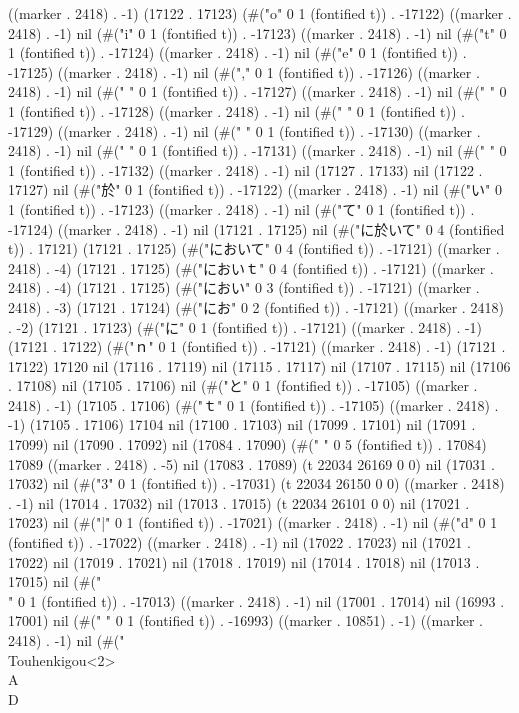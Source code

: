 ((marker . 2418) . -1) (17122 . 17123) (#("o" 0 1 (fontified t)) . -17122) ((marker . 2418) . -1) nil (#("i" 0 1 (fontified t)) . -17123) ((marker . 2418) . -1) nil (#("t" 0 1 (fontified t)) . -17124) ((marker . 2418) . -1) nil (#("e" 0 1 (fontified t)) . -17125) ((marker . 2418) . -1) nil (#("," 0 1 (fontified t)) . -17126) ((marker . 2418) . -1) nil (#("
" 0 1 (fontified t)) . -17127) ((marker . 2418) . -1) nil (#("	" 0 1 (fontified t)) . -17128) ((marker . 2418) . -1) nil (#("	" 0 1 (fontified t)) . -17129) ((marker . 2418) . -1) nil (#(" " 0 1 (fontified t)) . -17130) ((marker . 2418) . -1) nil (#(" " 0 1 (fontified t)) . -17131) ((marker . 2418) . -1) nil (#(" " 0 1 (fontified t)) . -17132) ((marker . 2418) . -1) nil (17127 . 17133) nil (17122 . 17127) nil (#("於" 0 1 (fontified t)) . -17122) ((marker . 2418) . -1) nil (#("い" 0 1 (fontified t)) . -17123) ((marker . 2418) . -1) nil (#("て" 0 1 (fontified t)) . -17124) ((marker . 2418) . -1) nil (17121 . 17125) nil (#("に於いて" 0 4 (fontified t)) . 17121) (17121 . 17125) (#("において" 0 4 (fontified t)) . -17121) ((marker . 2418) . -4) (17121 . 17125) (#("においｔ" 0 4 (fontified t)) . -17121) ((marker . 2418) . -4) (17121 . 17125) (#("におい" 0 3 (fontified t)) . -17121) ((marker . 2418) . -3) (17121 . 17124) (#("にお" 0 2 (fontified t)) . -17121) ((marker . 2418) . -2) (17121 . 17123) (#("に" 0 1 (fontified t)) . -17121) ((marker . 2418) . -1) (17121 . 17122) (#("ｎ" 0 1 (fontified t)) . -17121) ((marker . 2418) . -1) (17121 . 17122) 17120 nil (17116 . 17119) nil (17115 . 17117) nil (17107 . 17115) nil (17106 . 17108) nil (17105 . 17106) nil (#("と" 0 1 (fontified t)) . -17105) ((marker . 2418) . -1) (17105 . 17106) (#("ｔ" 0 1 (fontified t)) . -17105) ((marker . 2418) . -1) (17105 . 17106) 17104 nil (17100 . 17103) nil (17099 . 17101) nil (17091 . 17099) nil (17090 . 17092) nil (17084 . 17090) (#("		   " 0 5 (fontified t)) . 17084) 17089 ((marker . 2418) . -5) nil (17083 . 17089) (t 22034 26169 0 0) nil (17031 . 17032) nil (#("3" 0 1 (fontified t)) . -17031) (t 22034 26150 0 0) ((marker . 2418) . -1) nil (17014 . 17032) nil (17013 . 17015) (t 22034 26101 0 0) nil (17021 . 17023) nil (#("|" 0 1 (fontified t)) . -17021) ((marker . 2418) . -1) nil (#("d" 0 1 (fontified t)) . -17022) ((marker . 2418) . -1) nil (17022 . 17023) nil (17021 . 17022) nil (17019 . 17021) nil (17018 . 17019) nil (17014 . 17018) nil (17013 . 17015) nil (#("\\" 0 1 (fontified t)) . -17013) ((marker . 2418) . -1) nil (17001 . 17014) nil (16993 . 17001) nil (#("
" 0 1 (fontified t)) . -16993) ((marker . 10851) . -1) ((marker . 2418) . -1) nil (#("		     \\Touhenkigou<2>\\A\\D
